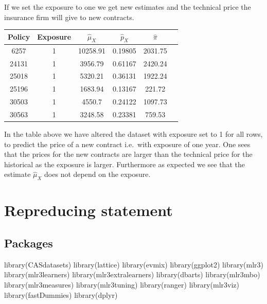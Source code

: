 \documentclass[
]{article}
\newenvironment{Shaded}{\begin{snugshade}}{\end{snugshade}}
\newcommand{\FunctionTok}[1]{\textcolor[rgb]{0.00,0.00,0.00}{#1}}
\newcommand{\NormalTok}[1]{#1}
\begin{document}
If we set the exposure to one we get new estimates and the technical
price the insurance firm will give to new contracts.

\begin{longtable}[]{@{}cccccc@{}}
\toprule()
Policy & Exposure & \(\hat \mu_X\) & \(\hat p_X\) & \(\hat \pi\) & \\
\midrule()
\endhead
6257 & 1 & 10258.91 & 0.19805 & 2031.75 & \\
24131 & 1 & 3956.79 & 0.61167 & 2420.24 & \\
25018 & 1 & 5320.21 & 0.36131 & 1922.24 & \\
25196 & 1 & 1683.94 & 0.13167 & 221.72 & \\
30503 & 1 & 4550.7 & 0.24122 & 1097.73 & \\
30563 & 1 & 3248.58 & 0.23381 & 759.53 & \\
\bottomrule()
\end{longtable}

In the table above we have altered the dataset with exposure set to 1
for all rows, to predict the price of a new contract i.e.~with exposure
of one year. One sees that the prices for the new contracts are larger
than the technical price for the historical as the exposure is larger.
Furthermore as expected we see that the estimate \(\hat \mu_X\) does not
depend on the exposure.

\newpage

\hypertarget{repreducing-statement}{%
\section{Repreducing statement}\label{repreducing-statement}}

\hypertarget{packages}{%
\subsection{Packages}\label{packages}}

\begin{Shaded}
\begin{Highlighting}[]
\FunctionTok{library}\NormalTok{(CASdatasets)}
\FunctionTok{library}\NormalTok{(lattice) }
\FunctionTok{library}\NormalTok{(evmix)}
\FunctionTok{library}\NormalTok{(ggplot2)}
\FunctionTok{library}\NormalTok{(mlr3)}
\FunctionTok{library}\NormalTok{(mlr3learners)}
\FunctionTok{library}\NormalTok{(mlr3extralearners)}
\FunctionTok{library}\NormalTok{(dbarts)}
\FunctionTok{library}\NormalTok{(mlr3mbo)}
\FunctionTok{library}\NormalTok{(mlr3measures)}
\FunctionTok{library}\NormalTok{(mlr3tuning)}
\FunctionTok{library}\NormalTok{(ranger)}
\FunctionTok{library}\NormalTok{(mlr3viz)}
\FunctionTok{library}\NormalTok{(fastDummies)}
\FunctionTok{library}\NormalTok{(dplyr)}
\end{Highlighting}
\end{Shaded}
\end{document}

